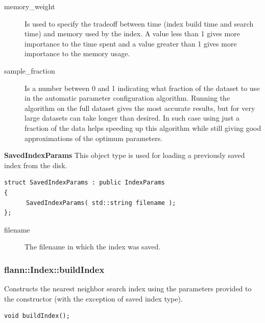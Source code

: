 \documentclass[letter,10pt]{article}
\begin{document}
\begin{description}
\begin{description}
\item[memory\_weight]{Is used to specify the tradeoff between
time (index build time and search time) and memory used by the index. A
value less than 1 gives more importance to the time spent and a value
greater than 1 gives more importance to the memory usage.}

\item[sample\_fraction]{Is a number between 0 and 1 indicating what fraction
of the dataset to use in the automatic parameter configuration algorithm. Running the 
algorithm on the full dataset gives the most accurate results, but for
very large datasets can take longer than desired. In such case using just a fraction of the
data helps speeding up this algorithm while still giving good approximations of the
optimum parameters.}
\end{description}

\textbf{SavedIndexParams}
This object type is used for loading a previously saved index from the disk.
\begin{Verbatim}[fontsize=\footnotesize]
struct SavedIndexParams : public IndexParams
{
      SavedIndexParams( std::string filename );
};
\end{Verbatim}
\begin{description}
\item[filename]{ The filename in which the index was saved. }
\end{description}
\end{description}

\subsubsection{flann::Index::buildIndex}
Constructs the nearest neighbor search index using the parameters provided to the constructor (with the
exception of saved index type).
\begin{Verbatim}[fontsize=\footnotesize,frame=single]
      void buildIndex();
\end{Verbatim}
\end{document}
